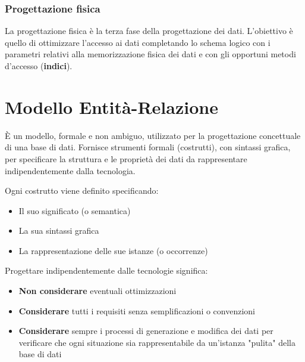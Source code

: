 \documentclass[a4paper]{article}
\begin{document}
\subsubsection{Progettazione fisica}
La progettazione fisica è la terza fase della progettazione dei dati. L'obiettivo è quello
di ottimizzare l'accesso ai dati completando lo schema logico con i parametri relativi
alla memorizzazione fisica dei dati e con gli opportuni metodi d'accesso (\textbf{indici}).

\section{Modello Entità-Relazione}
È un modello, formale e non ambiguo, utilizzato per la progettazione concettuale di una
base di dati. Fornisce strumenti formali (costrutti), con sintassi grafica, per specificare la
struttura e le proprietà dei dati da rappresentare indipendentemente dalla tecnologia.

\vspace{1em}
\noindent
Ogni costrutto viene definito specificando:
\begin{itemize}
  \item Il suo significato (o semantica)
  \item La sua sintassi grafica
  \item La rappresentazione delle sue istanze (o occorrenze)
\end{itemize}

\vspace{1em}
\noindent
Progettare indipendentemente dalle tecnologie significa:
\begin{itemize}
  \item \textbf{Non considerare} eventuali ottimizzazioni
  \item \textbf{Considerare} tutti i requisiti senza semplificazioni o convenzioni
  \item \textbf{Considerare} sempre i processi di generazione e modifica dei dati
    per verificare che ogni situazione sia rappresentabile da un'istanza "pulita"
    della base di dati
\end{itemize}
\end{document}
